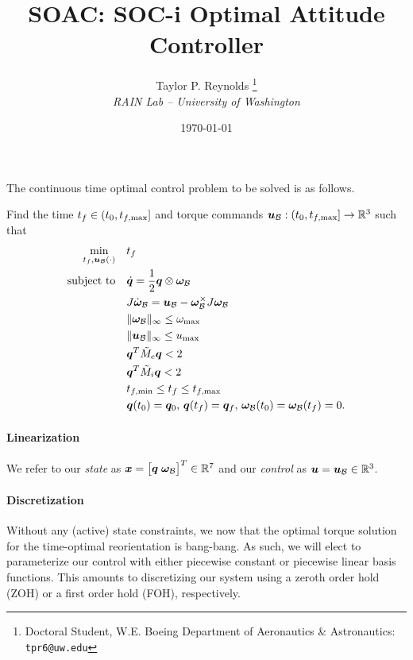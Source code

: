 \documentclass[12pt]{article}
\title{SOAC: SOC-i Optimal Attitude Controller}
\author{
  Taylor P. Reynolds%
  \thanks{Doctoral Student, W.E. Boeing Department of Aeronautics \& Astronautics: \texttt{tpr6@uw.edu} } 
\\
  {\normalsize\itshape
  RAIN Lab -- University of Washington}
 }
\date{\today}
\begin{document}
 
\maketitle

The continuous time optimal control problem to be solved is as follows. 
\begin{problem}\label{prob:prob1}
Find the time $t_f\in(t_0,t_{f,\max}]$ and torque commands $\bm{u}_{\mathcal{B}} : (t_0,t_{f,\max}] \rightarrow {\mathbb{R}}^3$ such that
\begin{subequations}
\begin{align}
\min_{t_f,\bm{u}_{\mathcal{B}}(\cdot)} &\quad t_f \\
\text{subject to} &\quad \dot{\bm{q}} = \frac{1}{2} \bm{q} \otimes \bm{\omega}_{\mathcal{B}}\\
&\quad J \dot{\bm{\omega}}_{\mathcal{B}} = \bm{u}_{\mathcal{B}} - \bm{\omega}_{\mathcal{B}}^{\times} J \bm{\omega}_{\mathcal{B}} \\
&\quad \| \bm{\omega}_{\mathcal{B}} \|_{\infty} \leq \omega_{\max} \\
&\quad \| \bm{u}_{\mathcal{B}} \|_{\infty} \leq u_{\max} \\
&\quad \bm{q}^T \tilde{M}_e \bm{q} < 2 \\
&\quad \bm{q}^T \tilde{M}_i \bm{q} < 2 \\
&\quad t_{f,\min} \leq t_f \leq t_{f,\max} \\
&\quad \bm{q}(t_0) = \bm{q}_0,\, \bm{q}(t_f) = \bm{q}_f,\,\bm{\omega}_{\mathcal{B}}(t_0) = \bm{\omega}_{\mathcal{B}}(t_f) = 0.
\end{align}
\end{subequations}
\end{problem} 

\paragraph{Linearization}
We refer to our \textit{state} as $\bm{x} = \big[ \bm{q} \; \bm{\omega}_{\mathcal{B}} \big]^T \in {\mathbb{R}}^7$ and our \textit{control} as $\bm{u} = \bm{u}_{\mathcal{B}} \in {\mathbb{R}}^3$. 


\paragraph{Discretization}

Without any (active) state constraints, we now that the optimal torque solution for the time-optimal reorientation is bang-bang. As such, we will elect to parameterize our control with either piecewise constant or piecewise linear basis functions. This amounts to discretizing our system using a zeroth order hold (ZOH) or a first order hold (FOH), respectively. 
\end{document}
